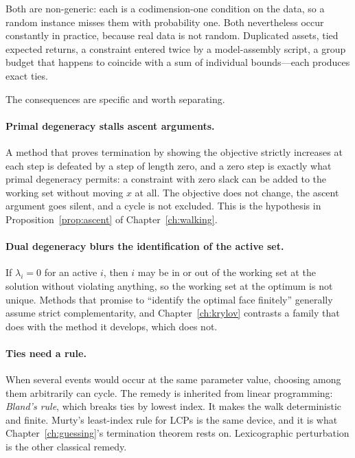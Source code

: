 Both are non-generic: each is a codimension-one condition on the data, so a
random instance misses them with probability one. Both nevertheless occur
constantly in practice, because real data is not random. Duplicated assets,
tied expected returns, a constraint entered twice by a model-assembly script, a
group budget that happens to coincide with a sum of individual bounds---each
produces exact ties.

The consequences are specific and worth separating.

\paragraph{Primal degeneracy stalls ascent arguments.} A method that proves
termination by showing the objective strictly increases at each step is defeated
by a step of length zero, and a zero step is exactly what primal degeneracy
permits: a constraint with zero slack can be added to the working set without
moving $x$ at all. The objective does not change, the ascent argument goes silent,
and a cycle is not excluded. This is the hypothesis in
Proposition~\ref{prop:ascent} of Chapter~\ref{ch:walking}.

\paragraph{Dual degeneracy blurs the identification of the active set.} If
$\lambda_i = 0$ for an active $i$, then $i$ may be in or out of the working set at
the solution without violating anything, so the working set at the optimum is not
unique. Methods that promise to ``identify the optimal face finitely'' generally
assume strict complementarity, and Chapter~\ref{ch:krylov} contrasts a family that
does with the method it develops, which does not.

\paragraph{Ties need a rule.} When several events would occur at the same
parameter value, choosing among them arbitrarily can cycle. The remedy is
inherited from linear programming: \emph{Bland's rule}, which breaks ties by
lowest index. It makes the walk deterministic and finite. Murty's least-index
rule for LCPs \cite{murty1988} is the same device, and it is what
Chapter~\ref{ch:guessing}'s termination theorem rests on. Lexicographic
perturbation is the other classical remedy.

